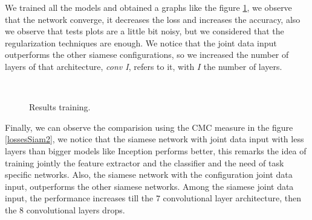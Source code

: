 We trained all the models and obtained a graphs like the figure \ref{lossesSiam}, we observe that the network converge, it decreases the loss and increases the accuracy, also we observe that tests plots are a little bit noisy, but we considered that the  regularization techniques are enough. We notice that the joint data input outperforms the other siamese configurations, so we increased the number of layers of that architecture, \textit{conv I}, refers to it, with $I$ the number of layers.

\begin{figure}[H]
		
\centering

\\

\caption{Results training.}
\label{lossesSiam}
\end{figure}



Finally, we can observe the comparision using the CMC measure in the figure \ref{lossesSiam2}, we notice that the siamese network with joint data input with less layers than bigger models like Inception performs better, this remarks the idea of training jointly the feature extractor and the classifier and the need of task specific networks. Also, the siamese network with the configuration joint data input, outperforms the other siamese networks. Among the siamese joint data input, the performance increases till the $7$ convolutional layer architecture, then the $8$ convolutional layers drops.

